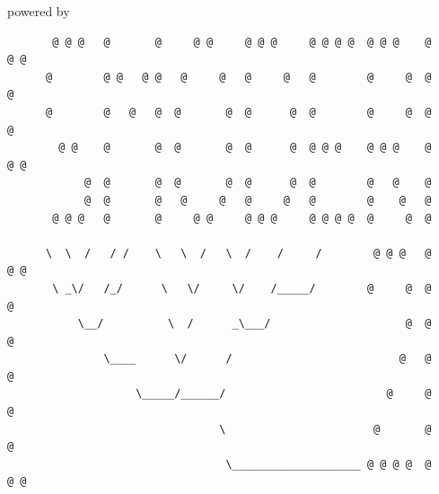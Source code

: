 \begin{columns}
\begin{column}{0.5\textwidth}
    \end{column}
    \begin{column}{0.4\textwidth}
    powered by
    {\tiny
    \begin{lstlisting}
       @ @ @   @       @     @ @     @ @ @     @ @ @ @  @ @ @    @ @ @
      @        @ @   @ @   @     @   @     @   @        @     @  @     @
      @        @   @   @  @       @  @      @  @        @     @  @     @
        @ @    @       @  @       @  @      @  @ @ @    @ @ @    @ @ @
            @  @       @  @       @  @      @  @        @   @    @
            @  @       @   @     @   @     @   @        @    @   @
       @ @ @   @       @     @ @     @ @ @     @ @ @ @  @     @  @

      \  \  /   / /    \   \  /   \  /    /     /        @ @ @   @ @ @
       \ _\/   /_/      \   \/     \/    /_____/        @     @  @     @
           \__/          \  /      _\___/                     @  @      @
               \____      \/      /                          @   @      @
                    \_____/______/                         @     @      @
                                 \                       @       @     @
                                  \____________________ @ @ @ @  @ @ @
    \end{lstlisting}
    }
    \end{column}
\end{columns}
